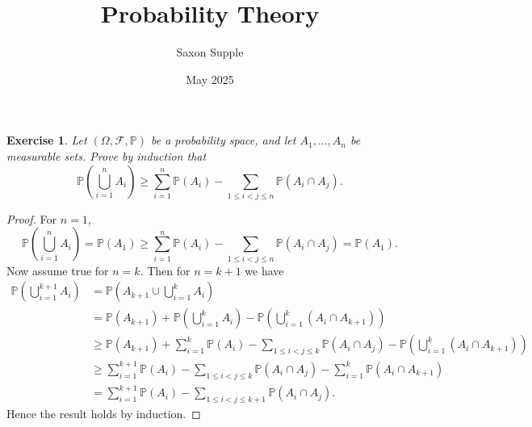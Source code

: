 \documentclass{article}
\title{Probability Theory}
\author{Saxon Supple}
\date{May 2025}
\newtheorem{exercise}[theorem]{Exercise}
\begin{document}
\maketitle

\begin{exercise}
Let $(\Omega,\mathcal{F},\mathbb{P})$ be a probability space, and let $A_1,...,A_n$ be measurable sets. Prove by induction that\[\mathbb{P}(\bigcup_{i=1}^nA_i)\geq\sum_{i=1}^n\mathbb{P}(A_i)-\sum_{1\leq i < j\leq n}\mathbb{P}(A_i\cap A_j).\]
\end{exercise}
\begin{proof}
For $n=1$, \[\mathbb{P}\left(\bigcup_{i=1}^n A_i\right)=\mathbb{P}(A_1)\geq\sum_{i=1}^n\mathbb{P}(A_i)-\sum_{1\leq i < j\leq n}\mathbb{P}(A_i\cap A_j)=\mathbb{P}(A_1).\] Now assume true for $n=k$. Then for $n=k+1$ we have\begin{align*}
\mathbb{P}\left(\bigcup_{i=1}^{k+1}A_i\right)&=\mathbb{P}\left(A_{k+1}\cup\bigcup_{i=1}^{k}A_i\right)\\&=\mathbb{P}(A_{k+1})+\mathbb{P}\left(\bigcup_{i=1}^{k}A_i\right)-\mathbb{P}\left(\bigcup_{i=1}^{k}(A_i\cap A_{k+1})\right)\\&\geq\mathbb{P}(A_{k+1})+\sum_{i=1}^k\mathbb{P}(A_i)-\sum_{1\leq i<j\leq k}\mathbb{P}(A_i\cap A_j)-\mathbb{P}\left(\bigcup_{i=1}^{k}(A_i\cap A_{k+1})\right)\\&\geq\sum_{i=1}^{k+1}\mathbb{P}(A_i)-\sum_{1\leq i<j\leq k}\mathbb{P}(A_i\cap A_j)-\sum_{i=1}^k\mathbb{P}(A_i\cap A_{k+1})\\&=\sum_{i=1}^{k+1}\mathbb{P}(A_i)-\sum_{1\leq i<j\leq k+1}\mathbb{P}(A_i\cap A_j).
\end{align*}
Hence the result holds by induction.
\end{proof}
\end{document}
